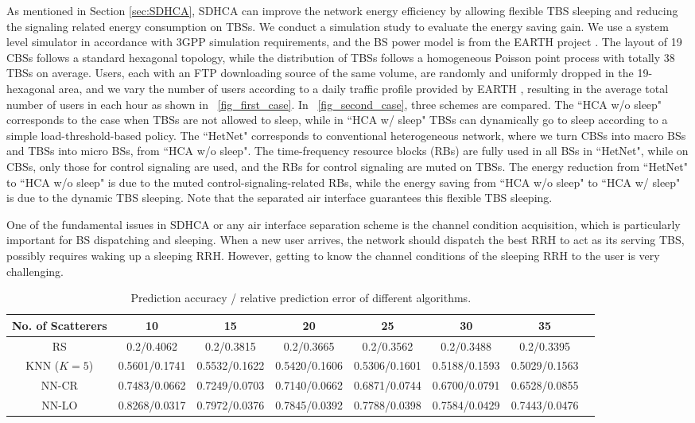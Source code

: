 \documentclass[12pt, draftclsnofoot,onecolumn]{IEEEtran}
\begin{document}
As mentioned in Section \ref{sec:SDHCA}, SDHCA can improve the network energy efficiency by allowing flexible TBS sleeping and reducing the signaling related energy consumption on TBSs. We
conduct a simulation study to evaluate the energy saving gain.  We use a system level simulator in accordance with
3GPP simulation requirements, and the BS power model is from the EARTH project
\cite{Earth}. The layout of 19 CBSs follows a standard hexagonal topology, while
the distribution of TBSs follows a homogeneous Poisson point process with
totally 38 TBSs on average. Users, each with an FTP downloading source of the same volume, are randomly and uniformly dropped in the 19-hexagonal area, and we vary the number of users according to a daily traffic
profile provided by EARTH \cite{Earth}, resulting in the average total number of users in
each hour as shown in \figurename~\ref{fig_first_case}. In \figurename~\ref{fig_second_case}, three schemes are compared. The ``HCA w/o sleep" corresponds to the case when TBSs are not allowed to sleep, while in ``HCA w/ sleep" TBSs can dynamically go to sleep according to a simple load-threshold-based policy. The ``HetNet" corresponds to conventional heterogeneous network, where we turn CBSs into macro BSs and TBSs into micro BSs, from ``HCA w/o sleep". The time-frequency resource blocks (RBs) are fully used in all BSs in ``HetNet", while on CBSs, only those for control signaling are used, and the RBs for control signaling are muted on TBSs. The energy reduction from ``HetNet" to ``HCA w/o sleep" is due to the muted control-signaling-related RBs, while the energy saving from ``HCA w/o sleep" to ``HCA w/ sleep" is due to the dynamic TBS sleeping. Note that the separated air interface guarantees this flexible TBS sleeping.

One of the fundamental issues in SDHCA or any air interface separation scheme is the channel
condition acquisition, which is particularly important for BS dispatching and
sleeping. When a new user arrives, the
network should dispatch the best RRH to act as its serving TBS, possibly
requires waking up a sleeping RRH. However, getting to know the channel
conditions of the sleeping RRH to the user is very challenging.

\begin{table}[!t]
\centering
\caption{Prediction accuracy / relative prediction error of different
algorithms.}
\label{tab:pred}
\begin{tabular}{|c|c|c|c|c|c|c|c|}
\hline
No. of Scatterers & 10 & 15 & 20 & 25 & 30 & 35 \\
\hline
RS & 0.2/0.4062 & 0.2/0.3815 & 0.2/0.3665 & 0.2/0.3562 & 0.2/0.3488 & 0.2/0.3395 \\
\hline
KNN ($K=5$) & 0.5601/0.1741 &	0.5532/0.1622 &	0.5420/0.1606 &	0.5306/0.1601 &	0.5188/0.1593 &	0.5029/0.1563 \\
\hline
NN-CR & 0.7483/0.0662 &	0.7249/0.0703 &	0.7140/0.0662 &	0.6871/0.0744 &	0.6700/0.0791 &	0.6528/0.0855 \\
\hline
NN-LO & 0.8268/0.0317 &	0.7972/0.0376 &	0.7845/0.0392 &	0.7788/0.0398 &	0.7584/0.0429 &	0.7443/0.0476 \\
\hline
\end{tabular}
\end{table}
\end{document}

